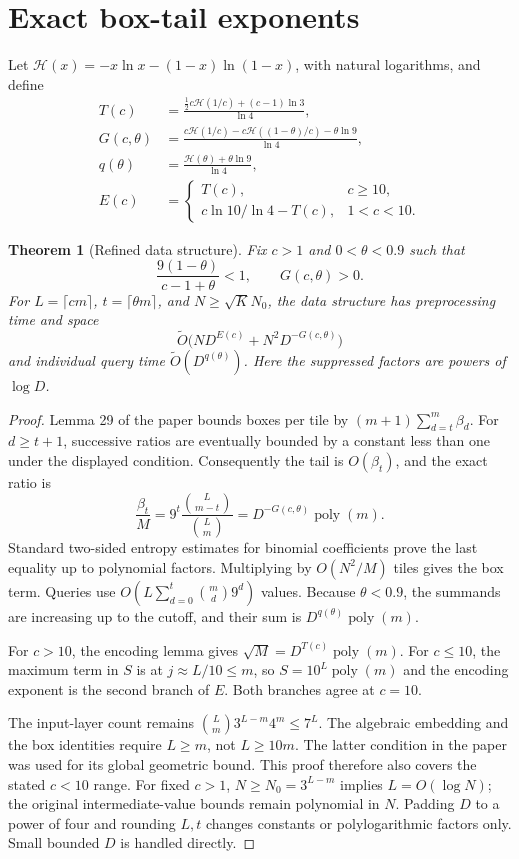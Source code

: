 \documentclass[11pt]{article}
\newtheorem{theorem}{Theorem}
\newcommand{\softO}{\widetilde O}
\newcommand{\HH}{\mathcal H}
\begin{document}
\section{Exact box-tail exponents}
Let $\HH(x)=-x\ln x-(1-x)\ln(1-x)$, with natural logarithms, and define
\begin{align}
T(c)&=\frac{\tfrac12c\HH(1/c)+(c-1)\ln3}{\ln4},\\
G(c,\theta)&=\frac{c\HH(1/c)-c\HH((1-\theta)/c)-\theta\ln9}{\ln4},\\
q(\theta)&=\frac{\HH(\theta)+\theta\ln9}{\ln4},\\
E(c)&=\begin{cases}
T(c),&c\ge10,\\
c\ln10/\ln4-T(c),&1<c<10.
\end{cases}
\end{align}

\begin{theorem}[Refined data structure]
\label{thm:refined}
Fix $c>1$ and $0<\theta<0.9$ such that
\[
\frac{9(1-\theta)}{c-1+\theta}<1,\qquad G(c,\theta)>0.
\]
For $L=\lceil cm\rceil$, $t=\lceil\theta m\rceil$, and
$N\ge\sqrt K N_0$, the data structure has preprocessing time and space
\[
\softO\bigl(ND^{E(c)}+N^2D^{-G(c,\theta)}\bigr)
\]
and individual query time $\softO(D^{q(\theta)})$.
Here the suppressed factors are powers of $\log D$.
\end{theorem}
\begin{proof}
Lemma 29 of the paper bounds boxes per tile by
$(m+1)\sum_{d=t}^m\beta_d$. For $d\ge t+1$, successive ratios are
eventually bounded by a constant less than one under the displayed
condition. Consequently the tail is $O(\beta_t)$, and the exact ratio is
\[
\frac{\beta_t}{M}
=9^t\frac{\binom L{m-t}}{\binom Lm}
=D^{-G(c,\theta)}\operatorname{poly}(m).
\]
Standard two-sided entropy estimates for binomial coefficients prove the
last equality up to polynomial factors. Multiplying by $O(N^2/M)$ tiles
gives the box term. Queries use
$O(L\sum_{d=0}^t\binom md9^d)$ values. Because $\theta<0.9$, the
summands are increasing up to the cutoff, and their sum is
$D^{q(\theta)}\operatorname{poly}(m)$.

For $c>10$, the encoding lemma gives $\sqrt M=D^{T(c)}\operatorname{poly}(m)$.
For $c\le10$, the maximum term in $S$ is at $j\approx L/10\le m$, so
$S=10^L\operatorname{poly}(m)$ and the encoding exponent is the second
branch of $E$. Both branches agree at $c=10$.

The input-layer count remains
$\binom Lm3^{L-m}4^m\le7^L$. The algebraic embedding and the box identities
require $L\ge m$, not $L\ge10m$. The latter condition in the paper was used
for its global geometric bound. This proof therefore also covers the
stated $c<10$ range. For fixed $c>1$, $N\ge N_0=3^{L-m}$ implies
$L=O(\log N)$; the original intermediate-value bounds remain polynomial
in $N$. Padding $D$ to a power of four and rounding $L,t$ changes constants
or polylogarithmic factors only. Small bounded $D$ is handled directly.
\end{proof}
\end{document}
